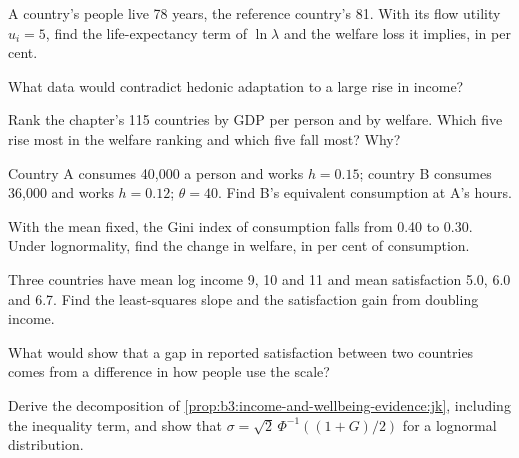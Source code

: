\begin{exercise}[$\star$]\label{exo:b3:income-and-wellbeing-evidence:3}
A country's people live 78 years, the reference country's 81. With its flow utility $u_i = 5$, find the
life-expectancy term of $\ln\lambda$ and the welfare loss it implies, in per cent.
\end{exercise}

\begin{exercise}[$\star$]\label{exo:b3:income-and-wellbeing-evidence:4}
What data would contradict hedonic adaptation to a large rise in income?
\end{exercise}

\begin{exercise}[$\star\star$]\label{exo:b3:income-and-wellbeing-evidence:5}
Rank the chapter's 115 countries by GDP per person and by welfare. Which five rise most in the
welfare ranking and which five fall most? Why?
\end{exercise}

\begin{exercise}[$\star\star$]\label{exo:b3:income-and-wellbeing-evidence:6}
Country A consumes 40{,}000 a person and works $h = 0.15$; country B consumes 36{,}000 and works $h = 0.12$; $\theta = 40$. Find B's
equivalent consumption at A's hours.
\end{exercise}

\begin{exercise}[$\star\star$]\label{exo:b3:income-and-wellbeing-evidence:7}
With the mean fixed, the Gini index of consumption falls from 0.40 to 0.30. Under lognormality, find the change in
welfare, in per cent of consumption.
\end{exercise}

\begin{exercise}[$\star\star$]\label{exo:b3:income-and-wellbeing-evidence:8}
Three countries have mean log income 9, 10 and 11 and mean satisfaction 5.0, 6.0 and 6.7. Find the least-squares slope and the
satisfaction gain from doubling income.
\end{exercise}

\begin{exercise}[$\star\star$]\label{exo:b3:income-and-wellbeing-evidence:9}
What would show that a gap in reported satisfaction between two countries comes
from a difference in how people use the scale?
\end{exercise}

\begin{exercise}[$\star\star\star$]\label{exo:b3:income-and-wellbeing-evidence:10}
Derive the decomposition of \cref{prop:b3:income-and-wellbeing-evidence:jk}, including the inequality term, and
show that $\sigma = \sqrt2\,\Phi^{-1}((1 + G)/2)$ for a lognormal distribution.
\end{exercise}

